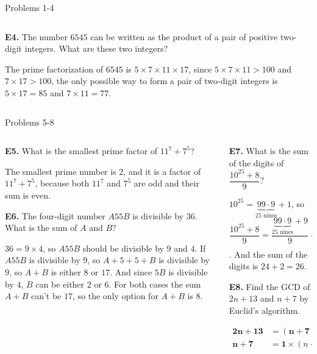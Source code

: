 \documentclass[9pt,aspectratio=169,handout]{beamer}
\begin{document}
\begin{frame}{Problems 1-4}
\begin{columns}[T]
\begin{column}{0.5\textwidth}
        \begin{problem}
            \textbf{E4.} The number $6545$ can be written as the product of a pair of positive two-digit integers. What are these two integers?
        \end{problem}\pause
        The prime factorization of $6545$ is $5 \times 7 \times 11 \times 17$, since $5 \times 7 \times 11 > 100$ and $7 \times 17 > 100$, the only possible way to form a pair of two-digit integers is $5 \times 17 = \boxed{85}$ and $7 \times 11 = \boxed{77}$.
    \end{column}
  \end{columns}
\end{frame}

\begin{frame}{Problems 5-8}
  \begin{columns}[T]
    \begin{column}{0.5\textwidth}
        \begin{problem}
            \textbf{E5.} What is the smallest prime factor of $11^7 + 7^5$?
        \end{problem}\pause
        The smallest prime number is $2$, and it is a factor of $11^7 + 7^5$, because both $11^7$ and $7^5$ are odd and their sum is even.\pause

        \begin{problem}
            \textbf{E6.} The four-digit number $A55B$ is divisible by $36$. What is the sum of $A$ and $B$?
        \end{problem}\pause
        $36 = 9 \times 4$, so $A55B$ should be divisible by $9$ and $4$. If $A55B$ is divisible by $9$, so $A + 5 + 5 + B$ is divisible by $9$, so $A + B$ is either $8$ or $17$. And since $5B$ is divisible by $4$, $B$ can be either $2$ or $6$. For both cases the sum $A + B$ can't be $17$, so the only option for $A + B$ is $\boxed{8}$. \pause
    \end{column}
    \begin{column}{0.5\textwidth}
        \begin{problem}
            \textbf{E7.} What is the sum of the digits of $\dfrac{10^{25}+8}{9}$?
        \end{problem}\pause
        $10^{25} = \underbrace{99\cdot 9}_{25\text{ nines}} + 1$, so $\dfrac{10^{25}+8}{9} = \dfrac{\underbrace{99\cdot 9}_{25\text{ nines}} + 9}{9} = \underbrace{11\cdot 1}_{25\text{ ones}} + 1 = \underbrace{11\cdot 1}_{24\text{ nines}}\!2$.
        And the sum of the digits is $24 + 2 = \boxed{26}$.\pause
        \begin{problem}
            \textbf{E8.} Find the GCD of $2n+13$ and $n+7$ by Euclid's algorithm.
        \end{problem}\pause
        \begin{align*}
            \mathbf{2n + 13} &= (\mathbf{n+7}) \times 2 - 1,\\
            \mathbf{n + 7} &= \boxed{\mathbf{1}} \times (n + 7) + 0.
        \end{align*}


\end{column}
\end{columns}
\end{frame}
\end{document}
